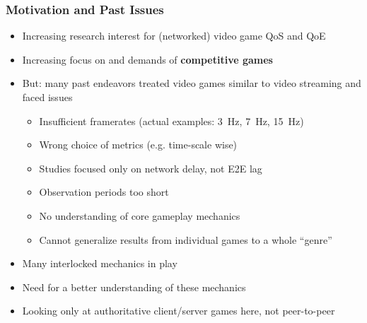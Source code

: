 \documentclass{UDEbeamerEN}
\begin{document}
\begin{frame}
	\frametitle{Motivation and Past Issues}

	\begin{itemize}
		\item Increasing research interest for (networked) video game QoS and QoE
		\item Increasing focus on and demands of \textbf{competitive games}
		\item But: many past endeavors treated video games similar to video streaming and faced issues
			\begin{itemize}
				\item Insufficient framerates (actual examples: \SI{3}{\hertz}, \SI{7}{\hertz}, \SI{15}{\hertz})
				\item Wrong choice of metrics (e.g. time-scale wise)
				\item Studies focused only on network delay, not E2E lag
				\item Observation periods too short
				\item No understanding of core gameplay mechanics
				\item Cannot generalize results from individual games to a whole ``genre''
			\end{itemize}

		\item Many interlocked mechanics in play
		\item Need for a better understanding of these mechanics
		\item Looking only at authoritative client/server games here, not peer-to-peer
	\end{itemize}

\end{frame}
\end{document}
